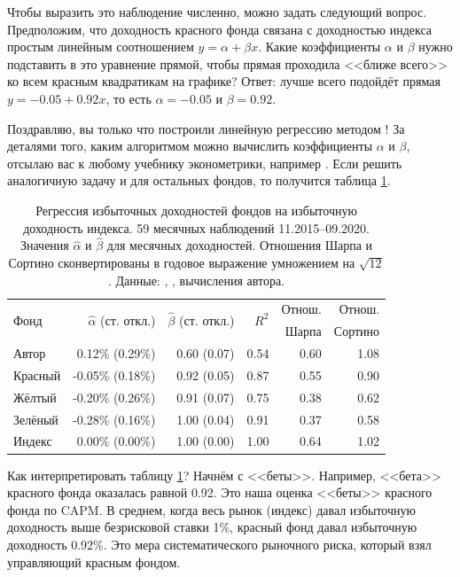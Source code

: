 Чтобы выразить это наблюдение численно, можно задать следующий вопрос. 
Предположим, что доходность красного фонда связана с доходностью индекса простым 
линейным соотношением $y = \alpha + \beta x$. Какие коэффициенты $\alpha$ и 
$\beta$ нужно подставить в это уравнение прямой, чтобы прямая проходила <<ближе 
всего>> ко всем красным квадратикам на графике? Ответ: лучше всего подойдёт 
прямая $y = -0.05 + 0.92x$, то есть $\alpha = -0.05$ и $\beta=0.92$.

Поздравляю, вы только что построили линейную регрессию методом ! За деталями того, каким алгоритмом 
можно вычислить коэффициенты $\alpha$ и $\beta$, отсылаю вас к любому учебнику 
эконометрики, например \cite[ch.~2]{verbeek2012guide}. Если решить аналогичную 
задачу и для остальных фондов, то получится таблица 
\ref{capm_regression_results}.

\begin{table}[ht]
\centering
\begin{tabular}{l|r|r|r|r|r}
\multirow{2}{*}{Фонд} & 
\multirow{2}{*}{$\hat{\alpha}$ (ст. откл.)} &
\multirow{2}{*}{$\hat{\beta}$ (ст. откл.)}  &
\multirow{2}{*}{$R^2$} &
Отнош.&
Отнош. \\
& & & & Шарпа & Сортино \\ \hline
Автор   &  0.12\% (0.29\%) & 0.60 (0.07) & 0.54 & 0.60 & 1.08 \\
Красный & -0.05\% (0.18\%) & 0.92 (0.05) & 0.87 & 0.55 & 0.90 \\
Жёлтый  & -0.20\% (0.26\%) & 0.91 (0.07) & 0.75 & 0.38 & 0.62 \\
Зелёный & -0.28\% (0.16\%) & 1.00 (0.04) & 0.91 & 0.37 & 0.58 \\ \hline
Индекс  &  0.00\% (0.00\%) & 1.00 (0.00) & 1.00 & 0.64 & 1.02
\end{tabular}
\caption{Регрессия избыточных доходностей фондов на избыточную доходность 
индекса. 59 месячных наблюдений 11.2015--09.2020. Значения $\hat{\alpha}$ и 
$\hat{\beta}$ для месячных доходностей. Отношения Шарпа и Сортино 
сконвертированы в годовое выражение умножением на $\sqrt{12}$.
Данные: \cite{moex2020}, \cite{cbr2020}, вычисления автора.}
\label{capm_regression_results}
\end{table}

Как интерпретировать таблицу \ref{capm_regression_results}? Начнём с <<беты>>. 
Например, <<бета>> красного фонда оказалась равной 0.92. Это наша оценка 
<<беты>> красного фонда по CAPM. В среднем, когда весь рынок (индекс) давал 
избыточную доходность выше безрисковой ставки 1\%, красный фонд давал избыточную 
доходность 0.92\%. Это мера систематического рыночного риска, который взял 
управляющий красным фондом.

